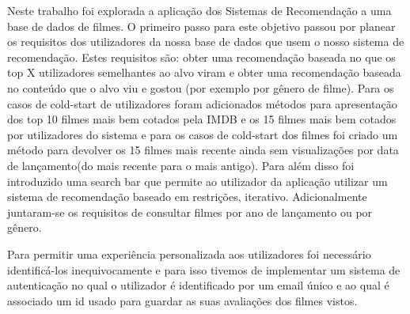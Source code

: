 Neste trabalho foi explorada a aplicação dos Sistemas de Recomendação a uma base de dados de filmes. O primeiro passo para este objetivo passou por planear os requisitos dos utilizadores da nossa base de dados que usem o nosso sistema de recomendação. Estes requisitos são: obter uma recomendação baseada no que os top X utilizadores semelhantes ao alvo viram e obter uma recomendação baseada no conteúdo que o alvo viu e gostou (por exemplo por gênero de filme). Para os casos de cold-start de utilizadores foram adicionados métodos para apresentação dos top 10 filmes mais bem cotados pela IMDB e os 15 filmes mais bem cotados por utilizadores do sistema e para os casos de cold-start dos filmes foi criado um método para devolver os 15 filmes mais recente ainda sem visualizações por data de lançamento(do mais recente para o mais antigo). Para além disso foi introduzido uma search bar que permite ao utilizador da aplicação utilizar um sistema de recomendação baseado em restrições, iterativo. Adicionalmente juntaram-se os requisitos de consultar filmes por ano de lançamento ou por gênero.
\par Para permitir uma experiência personalizada aos utilizadores foi necessário identificá-los inequivocamente e para isso tivemos de implementar um sistema de autenticação no qual o utilizador é identificado por um email único e ao qual é associado um id usado para guardar as suas avaliações dos filmes vistos.

\newpage

